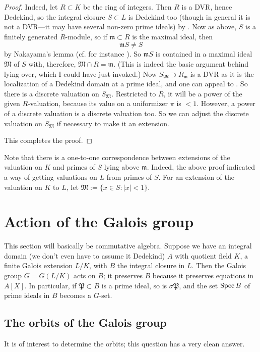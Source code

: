 \begin{proof}
Indeed, let $R \subset K$ be the ring of integers.  Then $R$ is a DVR, hence Dedekind, so the integral closure $S \subset L$ is Dedekind too (though in general it is not   a DVR---it may have several non-zero prime ideals) by .  Now as above, $S$ is a finitely generated $R$-module, so if $\mathfrak{m} \subset R$ is the maximal ideal, then 
\[ \mathfrak{m} S \neq S \]
by Nakayama's lemma (cf. for instance \cite{Ei95}).  So $\mathfrak{m} S$ is contained in a maximal ideal $\mathfrak{M}$ of $S$ with, therefore, $\mathfrak{M} \cap R = \mathfrak{m}$.  (This is indeed the basic argument behind lying over, which I could have just invoked.) Now $S_{\mathfrak{M}} \supset R_{\mathfrak{m}}$ is a DVR as it is the localization of a Dedekind domain at a prime ideal, and one can appeal to .  So there is a discrete valuation on $S_{\mathfrak{M}}$.  Restricted to $R$, it will be a power of the given $R$-valuation, because its value on a uniformizer $\pi$ is $<1$.  However, a power of a discrete valuation is a discrete valuation too.  So we can adjust the discrete valuation on $S_{\mathfrak{M}}$ if necessary to make it an extension.

This completes the proof.  
\end{proof}

Note that there is a one-to-one correspondence between extensions of the valuation on $K$ and primes of $S$ lying above $\mathfrak{m}$.   Indeed, the above proof indicated a way of getting valuations on $L$ from primes of $S$.  For an extension of the valuation on $K$ to $L$, let $\mathfrak{M} := \{ x \in S: \left| x \right| < 1\}$.
\section{Action of the Galois group}

This section will basically be commutative algebra.  Suppose we have an integral domain (we don't even have to assume it Dedekind) $A$ with quotient field $K$, a finite Galois extension $L/K$, with $B$ the integral closure in $L$.  Then the Galois group $G = G(L/K)$ acts on $B$; it preserves $B$ because it preserves equations in $A[X]$.
In particular, if $\mathfrak{P} \subset B$ is a prime ideal, so is $\sigma \mathfrak{P}$, and the set $\operatorname{Spec} B$ of prime ideals in $B$ becomes a $G$-set.

\subsection{The orbits of the Galois group} It is of interest to determine the orbits; this question has  a very clean answer.

